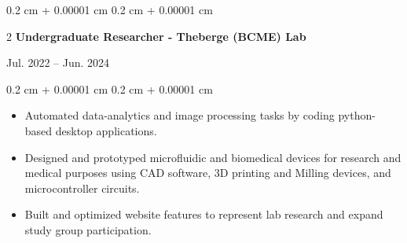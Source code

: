 \documentclass[10pt, letterpaper]{article}
\newenvironment{highlightsforbulletentries}{
    \begin{itemize}[
        topsep=0.10 cm,
        parsep=0.10 cm,
        partopsep=0pt,
        itemsep=0pt,
        leftmargin=10pt
    ]
}{
    \end{itemize}
} %
\newenvironment{onecolentry}{
    \begin{adjustwidth}{
        0.2 cm + 0.00001 cm
    }{
        0.2 cm + 0.00001 cm
    }
}{
    \end{adjustwidth}
} %
\newenvironment{twocolentry}[2][]{
    \onecolentry
    \def\secondColumn{#2}
    \setcolumnwidth{\fill, 4.5 cm}
    \begin{paracol}{2}
}{
    \switchcolumn \raggedleft \secondColumn
    \end{paracol}
    \endonecolentry
} %
\begin{document}
        \vspace{0.2 cm}

        \begin{twocolentry}{
            Jul. 2022 – Jun. 2024
        }{
            \textbf{Undergraduate Researcher - Theberge (BCME) Lab}
        }
        \end{twocolentry}
        \vspace{0.1 cm}
        \begin{onecolentry}
            \begin{highlightsforbulletentries}
                \item Automated data-analytics and image processing tasks by coding python-based desktop applications.
                \item Designed and prototyped microfluidic and biomedical devices for research and medical purposes
                using CAD software, 3D printing and Milling devices, and microcontroller circuits.
                \item Built and optimized website features to represent lab research and expand study group
                participation.
            \end{highlightsforbulletentries}
        \end{onecolentry}
\end{document}
